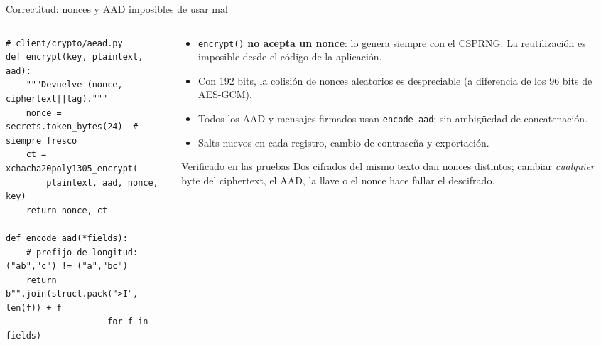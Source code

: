 \documentclass[aspectratio=169,10pt]{beamer}
\newcommand{\code}[1]{\texttt{\footnotesize #1}}
\begin{document}
\begin{frame}[fragile]{Correctitud: nonces y AAD imposibles de usar mal}
  \begin{columns}[T]
    \begin{column}{0.52\textwidth}
\begin{lstlisting}
# client/crypto/aead.py
def encrypt(key, plaintext, aad):
    """Devuelve (nonce, ciphertext||tag)."""
    nonce = secrets.token_bytes(24)  # siempre fresco
    ct = xchacha20poly1305_encrypt(
        plaintext, aad, nonce, key)
    return nonce, ct

def encode_aad(*fields):
    # prefijo de longitud: ("ab","c") != ("a","bc")
    return b"".join(struct.pack(">I", len(f)) + f
                    for f in fields)
\end{lstlisting}
    \end{column}
    \begin{column}{0.46\textwidth}
      \footnotesize
      \begin{itemize}
        \item \code{encrypt()} \textbf{no acepta un nonce}: lo genera siempre con el CSPRNG.
              La reutilización es imposible desde el código de la aplicación.
        \item Con 192 bits, la colisión de nonces aleatorios es despreciable
              (a diferencia de los 96 bits de AES-GCM).
        \item Todos los AAD y mensajes firmados usan \code{encode\_aad}: sin ambigüedad de
              concatenación.
        \item Salts nuevos en cada registro, cambio de contraseña y exportación.
      \end{itemize}
      \vspace{1mm}
      \begin{block}{\scriptsize Verificado en las pruebas}
        \scriptsize Dos cifrados del mismo texto dan nonces distintos; cambiar \emph{cualquier}
        byte del ciphertext, el AAD, la llave o el nonce hace fallar el descifrado.
      \end{block}
    \end{column}
  \end{columns}
\end{frame}
\end{document}
